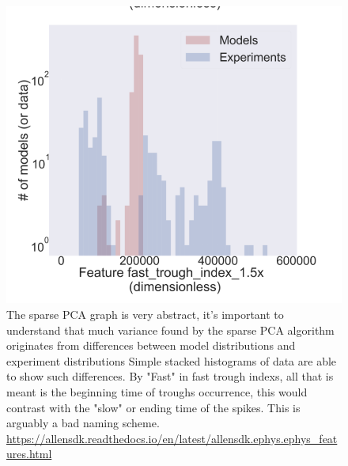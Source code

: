 \begin{figure}
    \centering
    \includegraphics[scale=0.75]{figures/fast_trough}
    \caption[Features that disagree. Slow Trough indexs, from the Allen cell types feature extraction]{The sparse PCA graph is very abstract, it's important to understand that much variance found by the sparse PCA algorithm originates from differences between model distributions and experiment distributions Simple stacked histograms of data are able to show such differences. By "Fast" in fast trough indexs, all that is meant is the beginning time of troughs occurrence, this would contrast with the "slow" or ending time of the spikes. This is arguably a bad naming scheme.
    \url{https://allensdk.readthedocs.io/en/latest/allensdk.ephys.ephys_features.html}
    }
    \label{fig:from_poster_disagree}
\end{figure}

